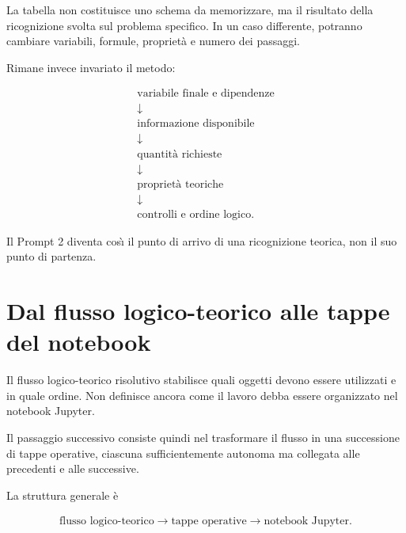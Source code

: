 La tabella non costituisce uno schema da memorizzare, ma il risultato della
ricognizione svolta sul problema specifico. In un caso differente, potranno
cambiare variabili, formule, propriet\`{a} e numero dei passaggi.

Rimane invece invariato il metodo:

\[
\begin{array}{c}
\text{variabile finale e dipendenze}
\\[3pt]
\downarrow
\\[3pt]
\text{informazione disponibile}
\\[3pt]
\downarrow
\\[3pt]
\text{quantit\`{a} richieste}
\\[3pt]
\downarrow
\\[3pt]
\text{propriet\`{a} teoriche}
\\[3pt]
\downarrow
\\[3pt]
\text{controlli e ordine logico}.
\end{array}
\]

Il Prompt 2 diventa cos\`{\i} il punto di arrivo di una ricognizione teorica,
non il suo punto di partenza.



\section{Dal flusso logico-teorico alle tappe del notebook}

Il flusso logico-teorico risolutivo stabilisce quali oggetti devono essere
utilizzati e in quale ordine. Non definisce ancora come il lavoro debba essere
organizzato nel notebook Jupyter.

Il passaggio successivo consiste quindi nel trasformare il flusso in
una successione di tappe operative, ciascuna sufficientemente autonoma ma
collegata alle precedenti e alle successive.

La struttura generale \`{e}

\vspace{-0.5cm}

\[
\begin{array}{c}
\text{flusso logico-teorico}
\rightarrow
\text{tappe operative}
\rightarrow
\text{notebook Jupyter}.
\end{array}
\]

